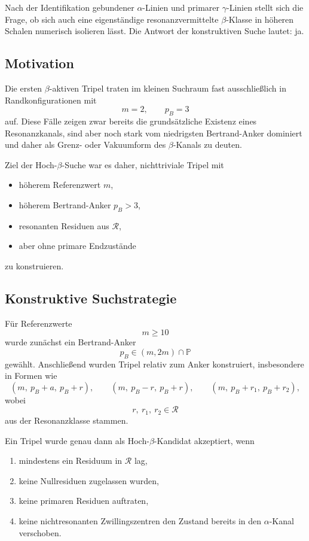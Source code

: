 \documentclass[11pt,a4paper]{article}
\theoremstyle{definition}
\theoremstyle{plain}
\theoremstyle{remark}
\begin{document}
	Nach der Identifikation gebundener \(\alpha\)-Linien und primarer \(\gamma\)-Linien stellt sich die Frage, ob sich auch eine eigenständige resonanzvermittelte \(\beta\)-Klasse in höheren Schalen numerisch isolieren lässt. 
	Die Antwort der konstruktiven Suche lautet: ja.
	
	\subsection{Motivation}
	
	Die ersten \(\beta\)-aktiven Tripel traten im kleinen Suchraum fast ausschließlich in Randkonfigurationen mit
	\[
	m=2,\qquad p_B=3
	\]
	auf. 
	Diese Fälle zeigen zwar bereits die grundsätzliche Existenz eines Resonanzkanals, sind aber noch stark vom niedrigsten Bertrand-Anker dominiert und daher als Grenz- oder Vakuumform des \(\beta\)-Kanals zu deuten.
	
	Ziel der Hoch-\(\beta\)-Suche war es daher, nichttriviale Tripel mit
	
	\begin{itemize}
		\item höherem Referenzwert \(m\),
		\item höherem Bertrand-Anker \(p_B>3\),
		\item resonanten Residuen aus \(\mathcal R\),
		\item aber ohne primare Endzustände
	\end{itemize}
	
	zu konstruieren.
	
	\subsection{Konstruktive Suchstrategie}
	
	Für Referenzwerte
	\[
	m\ge 10
	\]
	wurde zunächst ein Bertrand-Anker
	\[
	p_B\in(m,2m)\cap\mathbb P
	\]
	gewählt. 
	Anschließend wurden Tripel relativ zum Anker konstruiert, insbesondere in Formen wie
	\[
	(m,\ p_B+a,\ p_B+r),
	\qquad
	(m,\ p_B-r,\ p_B+r),
	\qquad
	(m,\ p_B+r_1,\ p_B+r_2),
	\]
	wobei
	\[
	r,\ r_1,\ r_2 \in \mathcal R
	\]
	aus der Resonanzklasse stammen.
	
	Ein Tripel wurde genau dann als Hoch-\(\beta\)-Kandidat akzeptiert, wenn
	
	\begin{enumerate}
		\item mindestens ein Residuum in \(\mathcal R\) lag,
		\item keine Nullresiduen zugelassen wurden,
		\item keine primaren Residuen auftraten,
		\item keine nichtresonanten Zwillingszentren den Zustand bereits in den \(\alpha\)-Kanal verschoben.
	\end{enumerate}
	
\end{document}
